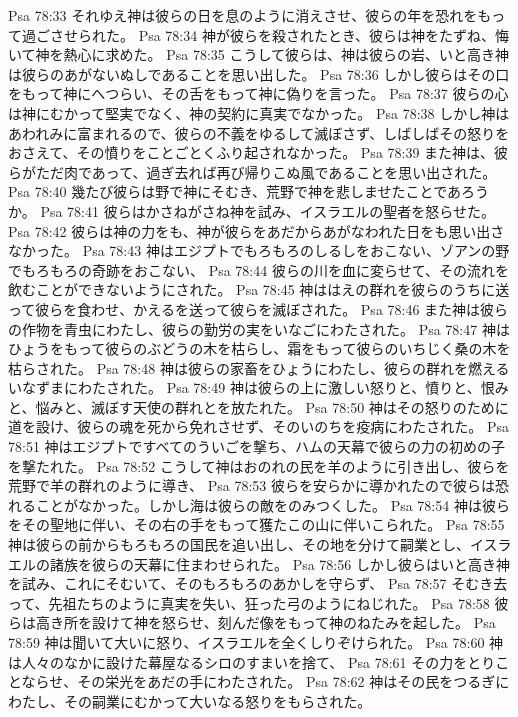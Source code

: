 Psa 78:33  それゆえ神は彼らの日を息のように消えさせ、彼らの年を恐れをもって過ごさせられた。
Psa 78:34  神が彼らを殺されたとき、彼らは神をたずね、悔いて神を熱心に求めた。
Psa 78:35  こうして彼らは、神は彼らの岩、いと高き神は彼らのあがないぬしであることを思い出した。
Psa 78:36  しかし彼らはその口をもって神にへつらい、その舌をもって神に偽りを言った。
Psa 78:37  彼らの心は神にむかって堅実でなく、神の契約に真実でなかった。
Psa 78:38  しかし神はあわれみに富まれるので、彼らの不義をゆるして滅ぼさず、しばしばその怒りをおさえて、その憤りをことごとくふり起されなかった。
Psa 78:39  また神は、彼らがただ肉であって、過ぎ去れば再び帰りこぬ風であることを思い出された。
Psa 78:40  幾たび彼らは野で神にそむき、荒野で神を悲しませたことであろうか。
Psa 78:41  彼らはかさねがさね神を試み、イスラエルの聖者を怒らせた。
Psa 78:42  彼らは神の力をも、神が彼らをあだからあがなわれた日をも思い出さなかった。
Psa 78:43  神はエジプトでもろもろのしるしをおこない、ゾアンの野でもろもろの奇跡をおこない、
Psa 78:44  彼らの川を血に変らせて、その流れを飲むことができないようにされた。
Psa 78:45  神ははえの群れを彼らのうちに送って彼らを食わせ、かえるを送って彼らを滅ぼされた。
Psa 78:46  また神は彼らの作物を青虫にわたし、彼らの勤労の実をいなごにわたされた。
Psa 78:47  神はひょうをもって彼らのぶどうの木を枯らし、霜をもって彼らのいちじく桑の木を枯らされた。
Psa 78:48  神は彼らの家畜をひょうにわたし、彼らの群れを燃えるいなずまにわたされた。
Psa 78:49  神は彼らの上に激しい怒りと、憤りと、恨みと、悩みと、滅ぼす天使の群れとを放たれた。
Psa 78:50  神はその怒りのために道を設け、彼らの魂を死から免れさせず、そのいのちを疫病にわたされた。
Psa 78:51  神はエジプトですべてのういごを撃ち、ハムの天幕で彼らの力の初めの子を撃たれた。
Psa 78:52  こうして神はおのれの民を羊のように引き出し、彼らを荒野で羊の群れのように導き、
Psa 78:53  彼らを安らかに導かれたので彼らは恐れることがなかった。しかし海は彼らの敵をのみつくした。
Psa 78:54  神は彼らをその聖地に伴い、その右の手をもって獲たこの山に伴いこられた。
Psa 78:55  神は彼らの前からもろもろの国民を追い出し、その地を分けて嗣業とし、イスラエルの諸族を彼らの天幕に住まわせられた。
Psa 78:56  しかし彼らはいと高き神を試み、これにそむいて、そのもろもろのあかしを守らず、
Psa 78:57  そむき去って、先祖たちのように真実を失い、狂った弓のようにねじれた。
Psa 78:58  彼らは高き所を設けて神を怒らせ、刻んだ像をもって神のねたみを起した。
Psa 78:59  神は聞いて大いに怒り、イスラエルを全くしりぞけられた。
Psa 78:60  神は人々のなかに設けた幕屋なるシロのすまいを捨て、
Psa 78:61  その力をとりことならせ、その栄光をあだの手にわたされた。
Psa 78:62  神はその民をつるぎにわたし、その嗣業にむかって大いなる怒りをもらされた。
